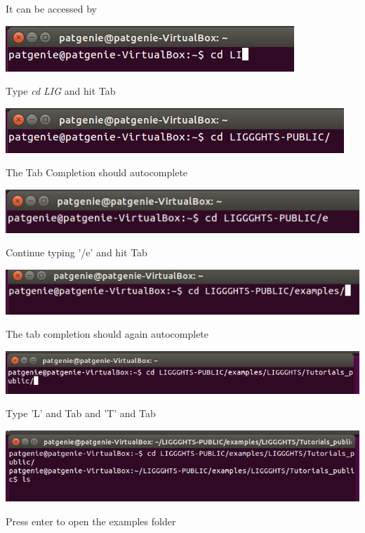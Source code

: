 \documentclass{tufte-book} %
\begin{document}
 It can be accessed by
\begin{marginfigure}
  \includegraphics[width=\linewidth]{graphics/Screenshot/Lig2.png}
\caption{Type \textit{cd LIG} and hit Tab}
  \includegraphics[width=\linewidth]{graphics/Screenshot/Lig3.png}
\caption{The Tab Completion should autocomplete}
  \includegraphics[width=\linewidth]{graphics/Screenshot/Lig4.png}
  \caption{Continue typing '/e' and hit Tab }
  \includegraphics[width=\linewidth]{graphics/Screenshot/Lig5.png}
  \caption{The tab completion should again autocomplete}
  \includegraphics[width=\linewidth]{graphics/Screenshot/Lig6.png}
  \caption{Type 'L' and Tab and 'T' and Tab}
  \includegraphics[width=\linewidth]{graphics/Screenshot/Lig7.png}
  \caption{Press enter to open the examples folder}
 
  \label{fig:lig1}
\end{marginfigure}
\end{document}

